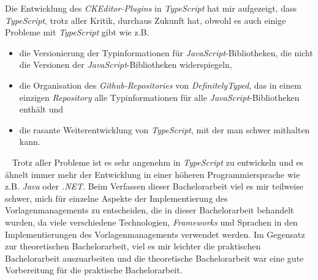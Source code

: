 Die Entwicklung des \emph{CKEditor-Plugins} in \emph{TypeScript} hat mir aufgezeigt, dass \emph{TypeScript}, trotz aller Kritik, durchaus Zukunft hat, obwohl es auch einige Probleme mit \emph{TypeScript} gibt wie z.B.
\begin{itemize}
	\item die Versionierung der Typinformationen für \emph{JavaScript}-Bibliotheken, die nicht die Versionen der \emph{JavaScript}-Bibliotheken widerspiegeln,
	\item die Organisation des \emph{Github-Repositories} von \emph{DefinitelyTyped}, das in einem einzigen \emph{Repository} alle Typinformationen für alle \emph{JavaScript}-Bibliotheken enthält und
	\item die rasante Weiterentwicklung von \emph{TypeScript}, mit der man schwer mithalten kann.
\end{itemize}
\ \newline
Trotz aller Probleme ist es sehr angenehm in \emph{TypeScript} zu entwickeln und es ähnelt immer mehr der Entwicklung in einer höheren Programmiersprache wie z.B. \emph{Java} oder \emph{.NET}.
\newline
\newline
Beim Verfassen dieser Bachelorarbeit viel es mir teilweise schwer, mich für einzelne Aspekte der Implementierung des Vorlagenmanagements zu entscheiden, die in dieser Bachelorarbeit behandelt wurden, da viele verschiedene Technologien, \emph{Frameworks} und Sprachen in den Implementierungen des Vorlagenmanagements verwendet werden. Im Gegensatz zur theoretischen Bachelorarbeit, viel es mir leichter die praktischen Bachelorarbeit auszuarbeiten und die theoretische Bachelorarbeit war eine gute Vorbereitung für die praktische Bachelorarbeit.
